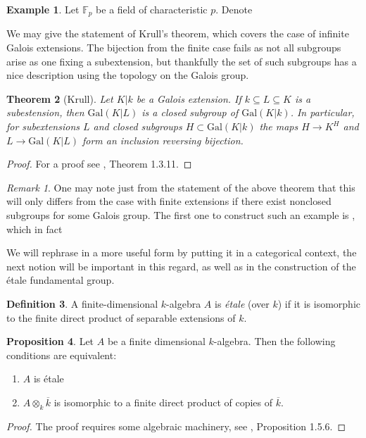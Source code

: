 \documentclass{article}
\newtheorem{theorem}{Theorem}[section]
\theoremstyle{definition}
\newtheorem{proposition}[theorem]{Proposition}
\newtheorem{definition}[theorem]{Definition}
\newtheorem{example}[theorem]{Example}
\theoremstyle{remark}
\newtheorem*{remark}{Remark}
\begin{document}
\begin{example}
	Let $\mathbb{F}_p$ be a field of characteristic $p$.
	Denote 

\end{example}
We may give the statement of Krull's theorem, which covers the case of infinite Galois extensions.
The bijection from the finite case fails as not all subgroups arise as one fixing a subextension, but thankfully the set of such subgroups has a nice description using the topology on the Galois group.
\begin{theorem}[Krull]
	Let $K | k$ be a Galois extension.
	If $k \subseteq L \subseteq K$ is a subestension, then $\text{Gal}(K|L)$ is a closed subgroup of $\text{Gal}(K|k)$.
	In particular, for subextensions $L$ and closed subgroups $H \subset \text{Gal}(K|k)$ the maps $H \to K^H$ and $L \to \text{Gal}(K|L)$ form an inclusion reversing bijection.
\end{theorem}

\begin{proof}
	For a proof see \cite{Szamuely}, Theorem 1.3.11. 
\end{proof}


\begin{remark}
	One may note just from the statement of the above theorem that this will only differs from the case with finite extensions if there exist nonclosed subgroups for some Galois group.
	The first one to construct such an example is , which in fact 
\end{remark}

We will rephrase  in a more useful form by putting it in a categorical context, the next notion will be important in this regard, as well as in the construction of the \'etale fundamental group.

\begin{definition} 
	A finite-dimensional $k$-algebra $A$ is \textit{\'etale} (over $k$) if it is isomorphic to the finite direct product of separable extensions of $k$.
\end{definition}

\begin{proposition} 
	Let $A$ be a finite dimensional $k$-algebra.
	Then the following conditions are equivalent:
	\begin{enumerate}
		\item $A$ is \'etale
		\item $A \otimes_k \overline{k}$ is isomorphic to a finite direct product of copies of $\overline{k}$.
	\end{enumerate}
\end{proposition}
\begin{proof}
	The proof requires some algebraic machinery, see \cite{Szamuely}, Proposition 1.5.6.
\end{proof}
\end{document}
